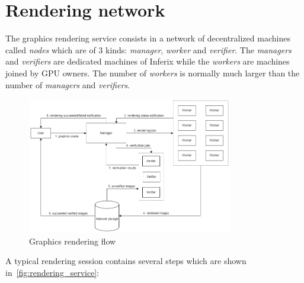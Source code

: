 \section[Rendering network]{Rendering network}
\label{sec:rendering_network}

The graphics rendering service consists in a network of decentralized machines called \emph{nodes} which are of $3$ kinds: \emph{manager}, \emph{worker} and \emph{verifier}. The \emph{managers} and \emph{verifiers} are dedicated machines of Inferix while the \emph{workers} are machines joined by GPU owners. The number of \emph{workers} is normally much larger than the number of \emph{managers} and \emph{verifiers}.
\begin{figure}[h]
    \centering
    \includegraphics[width=0.8\textwidth]{rendering_service.png}
    \caption[Graphics rendering flow]{Graphics rendering flow}
    \label{fig:rendering_service}
\end{figure}
A typical rendering session contains several steps which are shown in~\autoref{fig:rendering_service}:
